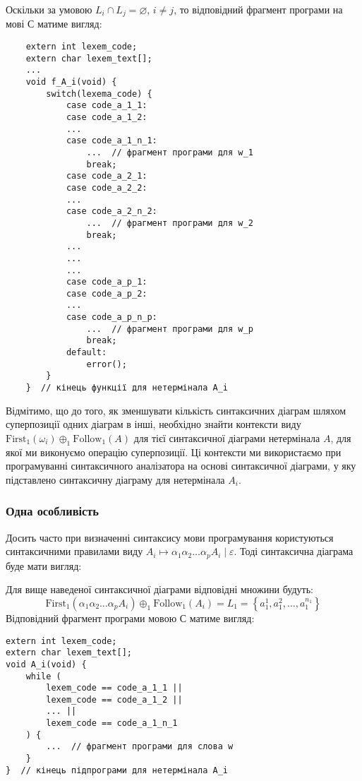 \begin{itemize}
	Оскільки за умовою $L_i \cap L_j = \varnothing$, $i \ne j$, то відповідний фрагмент програми на мові С матиме вигляд:
	\begin{verbatim}
	extern int lexem_code;
	extern char lexem_text[];
	...
	void f_A_i(void) {
	    switch(lexema_code) {
	        case code_a_1_1:
	        case code_a_1_2:
	        ...
	        case code_a_1_n_1:
	            ...  // фрагмент програми для w_1
	            break;
	        case code_a_2_1:
	        case code_a_2_2:
	        ...
	        case code_a_2_n_2:
	            ...  // фрагмент програми для w_2
	            break;
	        ...
	        ...
	        ...
	        case code_a_p_1:
	        case code_a_p_2:
	        ...
	        case code_a_p_n_p:
	            ...  // фрагмент програми для w_p
	            break;
	        default: 
	            error();
	    }
	}  // кінець функції для нетермінала A_i
	\end{verbatim}
\end{itemize}

Відмітимо, що до того, як зменшувати кількість синтаксичних діаграм шляхом суперпозиції одних діаграм в інші, необхідно знайти контексти виду $\text{First}_1(\omega_i) \oplus_1 \text{Follow}_1(A)$ для тієї синтаксичної діаграми нетермінала $A$, для якої ми виконуємо операцію суперпозиції. Ці контексти ми використаємо при програмуванні синтаксичного аналізатора на основі синтаксичної діаграми, у яку підставлено синтаксичну діаграму для нетермінала $A_i$.

\subsubsection{Одна особливість}

Досить часто при визначенні синтаксису мови програмування користуються синтаксичними правилами виду $A_i \mapsto \alpha_1 \alpha_2 \ldots \alpha_p A_i \mid \varepsilon$. Тоді синтаксична діаграма буде мати вигляд:
\begin{figure}[H]
	\centering
	
\end{figure}

Для вище наведеної синтаксичної діаграми відповідні множини будуть:
\begin{equation}
    \text{First}_1(\alpha_1 \alpha_2 \ldots \alpha_p A_i) \oplus_1 \text{Follow}_1(A_i) = L_1 = \left\{a_1^1, a_1^2, \ldots, a_1^{n_1}\right\}
\end{equation}
Відповідний фрагмент програми мовою С матиме вигляд:
\begin{verbatim}
extern int lexem_code;
extern char lexem_text[];
void A_i(void) {
    while (
        lexem_code == code_a_1_1 ||
        lexem_code == code_a_1_2 ||
        ... ||
        lexem_code == code_a_1_n_1
    ) {
        ...  // фрагмент програми для слова w
    }
}  // кінець підпрограми для нетермінала A_i
\end{verbatim}

